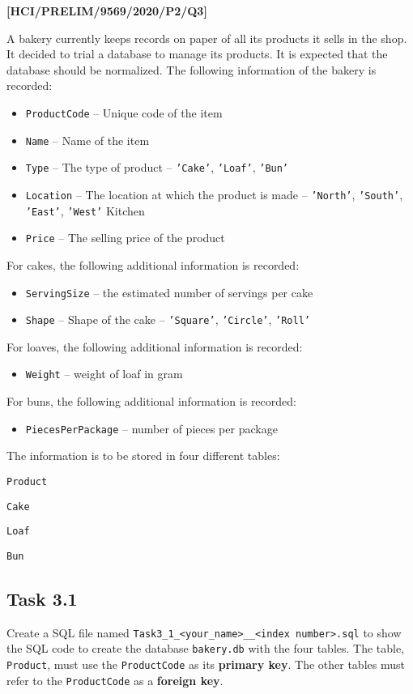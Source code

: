 \item \textbf{{[}HCI/PRELIM/9569/2020/P2/Q3{]} }

A bakery currently keeps records on paper of all its products it sells
in the shop. It decided to trial a database to manage its products.
It is expected that the database should be normalized. The following
information of the bakery is recorded: 
\begin{itemize}
\item \texttt{ProductCode} -- Unique code of the item 
\item \texttt{Name} -- Name of the item 
\item \texttt{Type} -- The type of product -- \texttt{'Cake'}, \texttt{'Loaf'},
\texttt{'Bun'} 
\item \texttt{Location} -- The location at which the product is made --
\texttt{'North'}, \texttt{'South'}, \texttt{'East'}, \texttt{'West'}
Kitchen 
\item \texttt{Price} -- The selling price of the product 
\end{itemize}
For cakes, the following additional information is recorded: 
\begin{itemize}
\item \texttt{ServingSize} -- the estimated number of servings per cake 
\item \texttt{Shape} -- Shape of the cake -- \texttt{'Square'}, \texttt{'Circle'},
\texttt{'Roll'} 
\end{itemize}
For loaves, the following additional information is recorded: 
\begin{itemize}
\item \texttt{Weight} -- weight of loaf in gram 
\end{itemize}
For buns, the following additional information is recorded:
\begin{itemize}
\item \texttt{PiecesPerPackage} -- number of pieces per package
\end{itemize}
The information is to be stored in four different tables: 

\texttt{Product }

\texttt{Cake }

\texttt{Loaf }

\texttt{Bun}

\subsection*{Task 3.1 }

Create a SQL file named \texttt{Task3\_1\_<your\_name>\_<centre number>\_<index
number>.sql} to show the SQL code to create the database \texttt{bakery.db}
with the four tables. The table, \texttt{Product}, must use the \texttt{ProductCode}
as its \textbf{primary key}. The other tables must refer to the \texttt{ProductCode}
as a \textbf{foreign key}.

